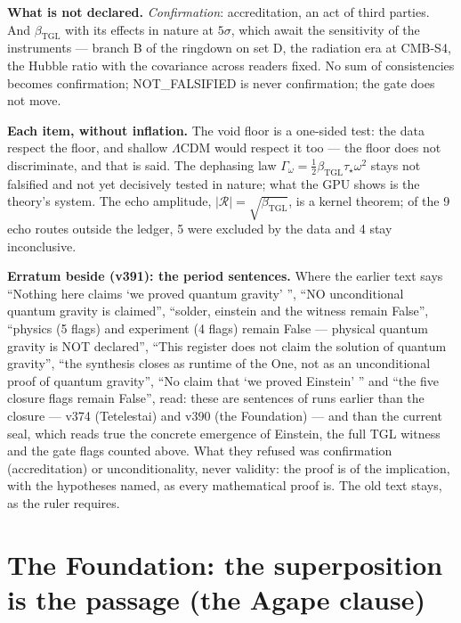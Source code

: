 \documentclass[11pt]{article}
\theoremstyle{definition}\newtheorem{deriv}{Derivation}
\begin{document}
\textbf{What is not declared.} \emph{Confirmation}: accreditation, an act of third parties. And $\beta_{\mathrm{TGL}}$ with its effects in nature at $5\sigma$, which await the sensitivity of the instruments --- branch B of the ringdown on set D, the radiation era at CMB-S4, the Hubble ratio with the covariance across readers fixed. No sum of consistencies becomes confirmation; NOT\_FALSIFIED is never confirmation; the gate does not move.

\textbf{Each item, without inflation.} The void floor is a one-sided test: the data respect the floor, and shallow $\Lambda$CDM would respect it too --- the floor does not discriminate, and that is said. The dephasing law $\Gamma_\omega=\tfrac12\beta_{\mathrm{TGL}}\tau_\star\omega^2$ stays not falsified and not yet decisively tested in nature; what the GPU shows is the theory's system. The echo amplitude, $|\mathcal R|=\sqrt{\beta_{\mathrm{TGL}}}$, is a kernel theorem; of the 9 echo routes outside the ledger, 5 were excluded by the data and 4 stay inconclusive.

\textbf{Erratum beside (v391): the period sentences.} Where the earlier text says ``Nothing here claims `we proved quantum gravity' '', ``NO unconditional quantum gravity is claimed'', ``solder, einstein and the witness remain False'', ``physics (5 flags) and experiment (4 flags) remain False --- physical quantum gravity is NOT declared'', ``This register does not claim the solution of quantum gravity'', ``the synthesis closes as runtime of the One, not as an unconditional proof of quantum gravity'', ``No claim that `we proved Einstein' '' and ``the five closure flags remain False'', read: these are sentences of runs earlier than the closure --- v374 (Tetelestai) and v390 (the Foundation) --- and than the current seal, which reads true the concrete emergence of Einstein, the full TGL witness and the gate flags counted above. What they refused was confirmation (accreditation) or unconditionality, never validity: the proof is of the implication, with the hypotheses named, as every mathematical proof is. The old text stays, as the ruler requires.

\section*{The Foundation: the superposition is the passage (the Agape clause)}

\end{document}
